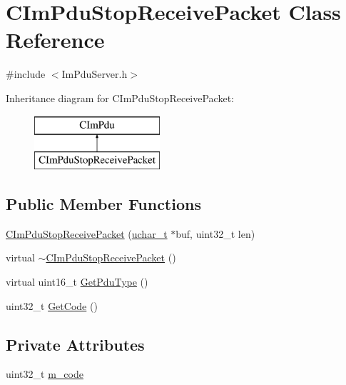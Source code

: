 \hypertarget{class_c_im_pdu_stop_receive_packet}{}\section{C\+Im\+Pdu\+Stop\+Receive\+Packet Class Reference}
\label{class_c_im_pdu_stop_receive_packet}


{\ttfamily \#include $<$Im\+Pdu\+Server.\+h$>$}

Inheritance diagram for C\+Im\+Pdu\+Stop\+Receive\+Packet\+:\begin{figure}[H]
\begin{center}
\leavevmode
\includegraphics[height=2.000000cm]{class_c_im_pdu_stop_receive_packet}
\end{center}
\end{figure}
\subsection*{Public Member Functions}
\begin{DoxyCompactItemize}
\item 
\hyperlink{class_c_im_pdu_stop_receive_packet_a1970be3800063a346ca3d711c700c5bc}{C\+Im\+Pdu\+Stop\+Receive\+Packet} (\hyperlink{base_2ostype_8h_a124ea0f8f4a23a0a286b5582137f0b8d}{uchar\+\_\+t} $\ast$buf, uint32\+\_\+t len)
\item 
virtual \hyperlink{class_c_im_pdu_stop_receive_packet_adf34691a41c7f02ff9564c8b1ed13681}{$\sim$\+C\+Im\+Pdu\+Stop\+Receive\+Packet} ()
\item 
virtual uint16\+\_\+t \hyperlink{class_c_im_pdu_stop_receive_packet_a974f93dcec9e31aa0de155924a9f9a4f}{Get\+Pdu\+Type} ()
\item 
uint32\+\_\+t \hyperlink{class_c_im_pdu_stop_receive_packet_a9ac095aa480fe1bcb87afeacb905b08c}{Get\+Code} ()
\end{DoxyCompactItemize}
\subsection*{Private Attributes}
\begin{DoxyCompactItemize}
\item 
uint32\+\_\+t \hyperlink{class_c_im_pdu_stop_receive_packet_a8d20d5a67b28f487e30c7ffb1d796265}{m\+\_\+code}
\end{DoxyCompactItemize}
